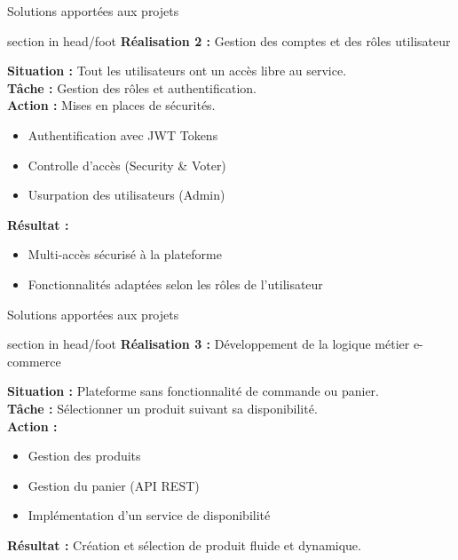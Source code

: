 \documentclass{beamer}
\begin{document}
\begin{frame}{Solutions apportées aux projets}
	\begin{beamercolorbox}[wd=\paperwidth,ht=1.5em,dp=0.5em,leftskip=0.5cm]{section in head/foot}
  		\large \textbf{Réalisation 2 :} \normalsize Gestion des comptes et des rôles utilisateur
	\end{beamercolorbox}
	\vspace{0.5em}
	\begin{center}
  		\begin{minipage}{0.9\textwidth}
  			\textbf{Situation :} Tout les utilisateurs ont un accès libre au service.\\
  			\textbf{Tâche :} Gestion des rôles et authentification.\\
  			\textbf{Action :} Mises en places de sécurités.
  				\begin{itemize}
  					\item Authentification avec JWT Tokens
  					\item Controlle d'accès (Security \& Voter)
  					\item Usurpation des utilisateurs (Admin)
  				\end{itemize}
			\textbf{Résultat :}
				\begin{itemize}
					\item Multi-accès sécurisé à la plateforme
					\item Fonctionnalités adaptées selon les rôles de l'utilisateur
				\end{itemize}
  		\end{minipage}
	\end{center}
	\vfill
\end{frame}

\begin{frame}{Solutions apportées aux projets}
	\begin{beamercolorbox}[wd=\paperwidth,ht=1.5em,dp=0.5em,leftskip=0.5cm]{section in head/foot}
  		\large \textbf{Réalisation 3 :} \normalsize Développement de la logique métier e-commerce
	\end{beamercolorbox}
	\vspace{0.5em}
	\begin{center}
  		\begin{minipage}{0.9\textwidth}
  			\textbf{Situation :} Plateforme sans fonctionnalité de commande ou panier.\\
  			\textbf{Tâche :} Sélectionner un produit suivant sa disponibilité.\\
  			\textbf{Action :}
				\begin{itemize}
					\item Gestion des produits
					\item Gestion du panier (API REST)
					\item Implémentation d'un service de disponibilité
				\end{itemize}
			\textbf{Résultat :} Création et sélection de produit fluide et dynamique.
  		\end{minipage}
	\end{center}
	\vfill
\end{frame}
\end{document}
